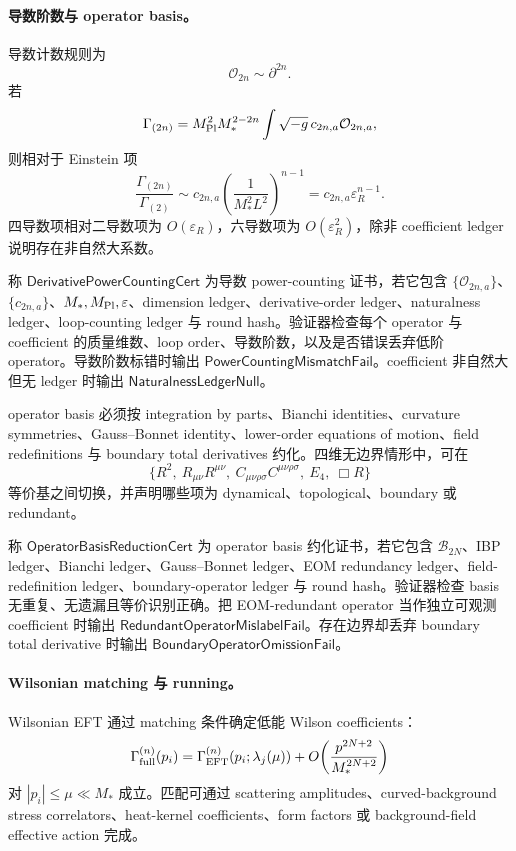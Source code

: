 \paragraph{导数阶数与 operator basis。}
导数计数规则为
\[
\mathcal O_{2n}\sim\partial^{2n}.
\]
若
\[
\Gamma_{(2n)}
=
M_{\rm Pl}^2M_*^{2-2n}
\int\sqrt{-g}\,c_{2n,a}\mathcal O_{2n,a},
\]
则相对于 Einstein 项
\[
\frac{\Gamma_{(2n)}}{\Gamma_{(2)}}
\sim
c_{2n,a}\left(\frac{1}{M_*^2L^2}\right)^{n-1}
=
c_{2n,a}\varepsilon_R^{n-1}.
\]
四导数项相对二导数项为 \(O(\varepsilon_R)\)，六导数项为 \(O(\varepsilon_R^2)\)，除非 coefficient ledger 说明存在非自然大系数。

\begin{definition}\label{def:typed-address-biaxial-completion-derivative-power-counting-cert}
称 \(\mathsf{DerivativePowerCountingCert}\) 为导数 power-counting 证书，若它包含 \(\{\mathcal O_{2n,a}\}\)、\(\{c_{2n,a}\}\)、\(M_*,M_{\rm Pl},\varepsilon\)、dimension ledger、derivative-order ledger、naturalness ledger、loop-counting ledger 与 round hash。验证器检查每个 operator 与 coefficient 的质量维数、loop order、导数阶数，以及是否错误丢弃低阶 operator。导数阶数标错时输出 \(\mathsf{PowerCountingMismatchFail}\)。coefficient 非自然大但无 ledger 时输出 \(\mathsf{NaturalnessLedgerNull}\)。
\end{definition}

operator basis 必须按 integration by parts、Bianchi identities、curvature symmetries、Gauss--Bonnet identity、lower-order equations of motion、field redefinitions 与 boundary total derivatives 约化。四维无边界情形中，可在
\[
\{R^2,\ R_{\mu\nu}R^{\mu\nu},\ C_{\mu\nu\rho\sigma}C^{\mu\nu\rho\sigma},\ E_4,\ \Box R\}
\]
等价基之间切换，并声明哪些项为 dynamical、topological、boundary 或 redundant。

\begin{definition}\label{def:typed-address-biaxial-completion-operator-basis-reduction-cert}
称 \(\mathsf{OperatorBasisReductionCert}\) 为 operator basis 约化证书，若它包含 \(\mathcal B_{2N}\)、IBP ledger、Bianchi ledger、Gauss--Bonnet ledger、EOM redundancy ledger、field-redefinition ledger、boundary-operator ledger 与 round hash。验证器检查 basis 无重复、无遗漏且等价识别正确。把 EOM-redundant operator 当作独立可观测 coefficient 时输出 \(\mathsf{RedundantOperatorMislabelFail}\)。存在边界却丢弃 boundary total derivative 时输出 \(\mathsf{BoundaryOperatorOmissionFail}\)。
\end{definition}

\paragraph{Wilsonian matching 与 running。}
Wilsonian EFT 通过 matching 条件确定低能 Wilson coefficients：
\[
\Gamma_{\rm full}^{(n)}(p_i)
=
\Gamma_{\rm EFT}^{(n)}(p_i;\lambda_j(\mu))
+
O\!\left(\frac{p^{2N+2}}{M_*^{2N+2}}\right)
\]
对 \(|p_i|\le\mu\ll M_*\) 成立。匹配可通过 scattering amplitudes、curved-background stress correlators、heat-kernel coefficients、form factors 或 background-field effective action 完成。

